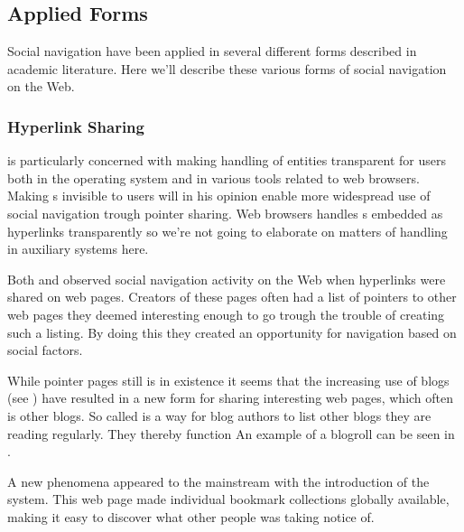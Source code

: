 \subsection{Applied Forms}

Social navigation have been applied in several different forms described in
academic literature. Here we'll describe these various forms of social
navigation on the Web.

\subsubsection{Hyperlink Sharing}

\citet{dieberger97} is particularly concerned with making handling of
%
entities transparent for users both in the operating system and in various
tools related to web browsers. Making s invisible to users will in
his opinion enable more widespread use of social navigation trough pointer
sharing. Web browsers handles s embedded as hyperlinks transparently
so we're not going to elaborate on matters of  handling in
auxiliary systems here.

Both \cite{dourish94} and \cite{dieberger97} observed social navigation
activity on the
Web when hyperlinks were shared on web pages. Creators of these pages often
had a list of pointers to other web pages they deemed interesting enough to go
trough the trouble of creating such a listing. By doing this they created
an opportunity for navigation based on social factors.

While pointer pages still is in existence it seems that the increasing
use of blogs (see )
have resulted in a new form for sharing interesting web pages,
which often is other blogs. So called  is a way for blog
authors to list other blogs they are reading regularly. They thereby function
An example of a blogroll can be seen in .

A new phenomena appeared to the mainstream with the introduction of the
 system. This web page made individual
bookmark collections globally available, making it easy to discover what other
people was taking notice of.

